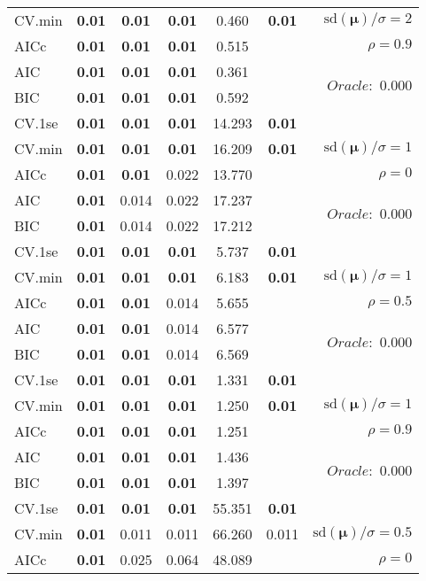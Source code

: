 \begin{table}
\begin{center}
\begin{tabular}{l*{5}{c}|r}
CV.min & {\bf 0.01} & {\bf 0.01} & {\bf 0.01} & 0.460 & {\bf 0.01} &  $\mathrm{sd}(\mathbf{\mu})/\sigma=2$ \\
AICc & {\bf 0.01} & {\bf 0.01} & {\bf 0.01} & 0.515 & & $\rho=0.9$ \\
AIC & {\bf 0.01} & {\bf 0.01} & {\bf 0.01} & 0.361 & &  \multirow{2}{*}{$Oracle: $ 0.000} \\
BIC & {\bf 0.01} & {\bf 0.01} & {\bf 0.01} & 0.592 & &  \\
 \hline 
CV.1se & {\bf 0.01} & {\bf 0.01} & {\bf 0.01} & 14.293 & {\bf 0.01} & \\
CV.min & {\bf 0.01} & {\bf 0.01} & {\bf 0.01} & 16.209 & {\bf 0.01} &  $\mathrm{sd}(\mathbf{\mu})/\sigma=1$ \\
AICc & {\bf 0.01} & {\bf 0.01} & 0.022 & 13.770 & & $\rho=0$ \\
AIC & {\bf 0.01} & 0.014 & 0.022 & 17.237 & &  \multirow{2}{*}{$Oracle: $ 0.000} \\
BIC & {\bf 0.01} & 0.014 & 0.022 & 17.212 & &  \\
 \hline 
CV.1se & {\bf 0.01} & {\bf 0.01} & {\bf 0.01} & 5.737 & {\bf 0.01} & \\
CV.min & {\bf 0.01} & {\bf 0.01} & {\bf 0.01} & 6.183 & {\bf 0.01} &  $\mathrm{sd}(\mathbf{\mu})/\sigma=1$ \\
AICc & {\bf 0.01} & {\bf 0.01} & 0.014 & 5.655 & & $\rho=0.5$ \\
AIC & {\bf 0.01} & {\bf 0.01} & 0.014 & 6.577 & &  \multirow{2}{*}{$Oracle: $ 0.000} \\
BIC & {\bf 0.01} & {\bf 0.01} & 0.014 & 6.569 & &  \\
 \hline 
CV.1se & {\bf 0.01} & {\bf 0.01} & {\bf 0.01} & 1.331 & {\bf 0.01} & \\
CV.min & {\bf 0.01} & {\bf 0.01} & {\bf 0.01} & 1.250 & {\bf 0.01} &  $\mathrm{sd}(\mathbf{\mu})/\sigma=1$ \\
AICc & {\bf 0.01} & {\bf 0.01} & {\bf 0.01} & 1.251 & & $\rho=0.9$ \\
AIC & {\bf 0.01} & {\bf 0.01} & {\bf 0.01} & 1.436 & &  \multirow{2}{*}{$Oracle: $ 0.000} \\
BIC & {\bf 0.01} & {\bf 0.01} & {\bf 0.01} & 1.397 & &  \\
 \hline 
CV.1se & {\bf 0.01} & {\bf 0.01} & {\bf 0.01} & 55.351 & {\bf 0.01} & \\
CV.min & {\bf 0.01} & 0.011 & 0.011 & 66.260 & 0.011 &  $\mathrm{sd}(\mathbf{\mu})/\sigma=0.5$ \\
AICc & {\bf 0.01} & 0.025 & 0.064 & 48.089 & & $\rho=0$ \\

\end{tabular}
\end{center}
\end{table}
